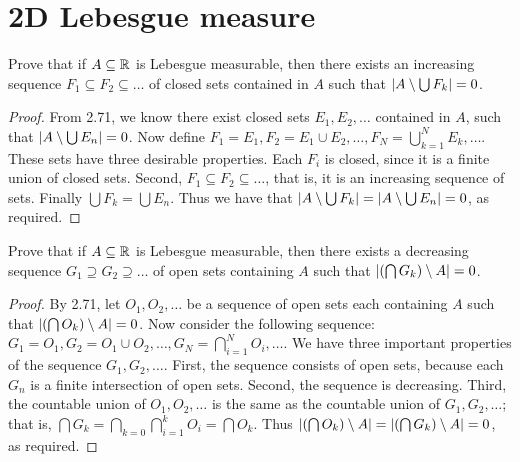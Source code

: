 \section{2D Lebesgue measure}


\begin{exercise}{5}
Prove that if $A \subseteq \mathbb{R}$ is Lebesgue measurable, then there exists an increasing sequence $F_1 \subseteq F_2 \subseteq \dots$ of closed sets contained in $A$ such that $\left\lvert A \setminus \bigcup F_k\right\rvert = 0$.
\end{exercise}
\begin{proof}
From 2.71, we know there exist closed sets $E_1,E_2,\dots$ contained in $A$, such that $\left\lvert A \setminus \bigcup E_n\right\rvert = 0$.
Now define $F_1 = E_1, F_2 = E_1 \cup E_2, \dots, F_N = \bigcup^N_{k=1} E_k, \dots$.
These sets have three desirable properties.
Each $F_i$ is closed, since it is a finite union of closed sets.
Second, $F_1 \subseteq F_2 \subseteq \dots$, that is, it is an increasing sequence of sets.
Finally $\bigcup F_k = \bigcup E_n$.
Thus we have that $\left\lvert A \setminus \bigcup F_k\right\rvert = \left\lvert A \setminus \bigcup E_n\right\rvert = 0$, as required.
\end{proof} 

\begin{exercise}{7}
Prove that if $A \subseteq \mathbb{R}$ is Lebesgue measurable, then there exists a decreasing sequence $G_1 \supseteq G_2 \supseteq \dots$ of open sets containing $A$ such that $\left\lvert \left( \bigcap G_k\right) \setminus A\right\rvert = 0$.
\end{exercise}
\begin{proof}
By 2.71, let $O_1, O_2, \dots$ be a sequence of open sets each containing $A$ such that $\left\lvert \left( \bigcap O_k\right) \setminus A\right\rvert = 0$.
Now consider the following sequence: $G_1 = O_1, G_2 = O_1 \cup O_2, \dots, G_N = \bigcap_{i=1}^N O_i,\dots$.
We have three important properties of the sequence $G_1, G_2, \dots$.
First, the sequence consists of open sets, because each $G_n$ is a finite intersection of open sets.
Second, the sequence is decreasing.
Third, the countable union of $O_1, O_2, \dots$ is the same as the countable union of $G_1, G_2, \dots$; 
that is, $\bigcap G_k = \bigcap_{k=0} \bigcap_{i=1}^k O_i = \bigcap O_k$.
Thus $\left\lvert \left( \bigcap O_k\right) \setminus A\right\rvert = \left\lvert \left( \bigcap G_k\right) \setminus A\right\rvert = 0$, as required.
\end{proof} 

